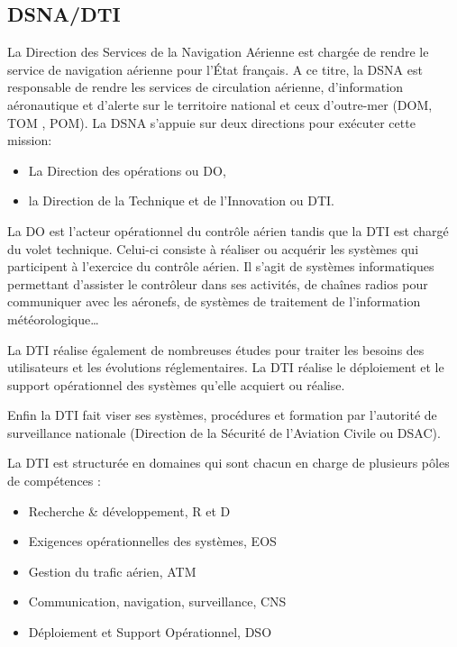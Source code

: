     \subsection{DSNA/DTI}
La Direction des Services de la Navigation Aérienne est chargée de rendre le service de navigation aérienne pour l’État français. A ce titre, la DSNA est responsable de rendre les services de circulation aérienne, d’information aéronautique et d’alerte sur le territoire national et ceux d’outre-mer (DOM, TOM , POM). La DSNA s’appuie sur deux directions pour exécuter cette mission:
\begin{itemize}
  \item La Direction des opérations ou DO,
  \item la Direction de la Technique et de l’Innovation ou DTI.
\end{itemize}\medskip
La DO est l’acteur opérationnel du contrôle aérien tandis que la DTI est chargé du volet technique. Celui-ci consiste à réaliser ou acquérir les systèmes qui participent à l’exercice du contrôle aérien. Il s’agit de systèmes informatiques permettant d’assister le contrôleur dans ses activités, de chaînes radios pour communiquer avec les aéronefs, de systèmes de traitement de l’information météorologique…

La DTI réalise également de nombreuses études pour traiter les besoins des utilisateurs et les évolutions réglementaires. La DTI réalise le déploiement et le support opérationnel des systèmes qu’elle acquiert ou réalise. 

Enfin la DTI fait viser ses systèmes, procédures et formation par l’autorité de surveillance nationale (Direction de la Sécurité de l'Aviation Civile ou DSAC).

La DTI est structurée en domaines qui sont chacun en charge de plusieurs pôles de compétences :
\begin{itemize}
  \item Recherche \& développement, R et D
  \item Exigences opérationnelles des systèmes, EOS
  \item Gestion du trafic aérien, ATM
  \item Communication, navigation, surveillance, CNS
  \item Déploiement et Support Opérationnel, DSO
\end{itemize}\medskip

